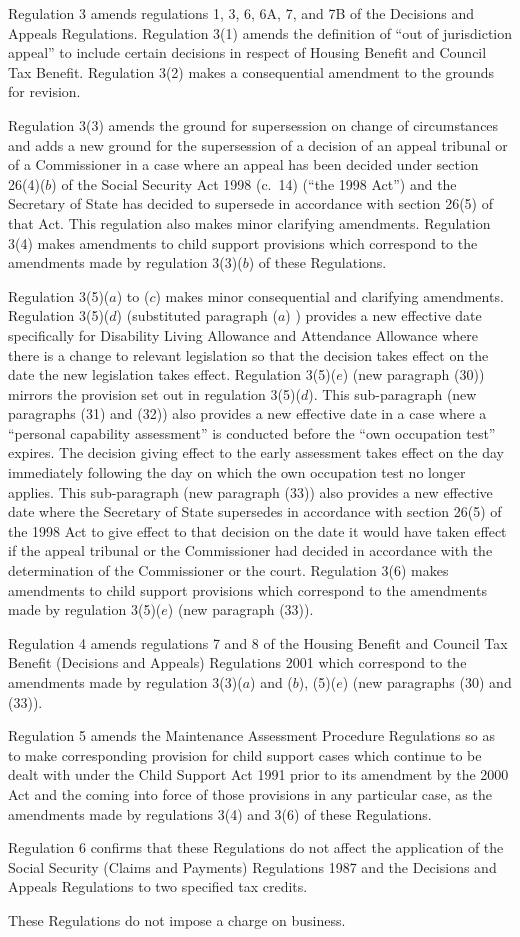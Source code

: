 \documentclass[12pt,a4paper]{article}
\begin{document}
Regulation 3 amends regulations 1, 3, 6, 6A, 7, and 7B of the Decisions and Appeals Regulations. Regulation 3(1) amends the definition of “out of jurisdiction appeal” to include certain decisions in respect of Housing Benefit and Council Tax Benefit. Regulation 3(2) makes a consequential amendment to the grounds for revision.

Regulation 3(3) amends the ground for supersession on change of circumstances and adds a new ground for the supersession of a decision of an appeal tribunal or of a Commissioner in a case where an appeal has been decided under section 26(4)($b$)  of the Social Security Act 1998 (c.\ 14) (“the 1998 Act”) and the Secretary of State has decided to supersede in accordance with section 26(5) of that Act. This regulation also makes minor clarifying amendments. Regulation 3(4) makes amendments to child support provisions which correspond to the amendments made by regulation 3(3)($b$)  of these Regulations.

Regulation 3(5)($a$)  to ($c$)  makes minor consequential and clarifying amendments. Regulation 3(5)($d$)  (substituted paragraph ($a$) ) provides a new effective date specifically for Disability Living Allowance and Attendance Allowance where there is a change to relevant legislation so that the decision takes effect on the date the new legislation takes effect. Regulation 3(5)($e$)  (new paragraph (30)) mirrors the provision set out in regulation 3(5)($d$). This sub-paragraph (new paragraphs (31) and (32)) also provides a new effective date in a case where a “personal capability assessment” is conducted before the “own occupation test” expires. The decision giving effect to the early assessment takes effect on the day immediately following the day on which the own occupation test no longer applies. This sub-paragraph (new paragraph (33)) also provides a new effective date where the Secretary of State supersedes in accordance with section 26(5) of the 1998 Act to give effect to that decision on the date it would have taken effect if the appeal tribunal or the Commissioner had decided in accordance with the determination of the Commissioner or the court. Regulation 3(6) makes amendments to child support provisions which correspond to the amendments made by regulation 3(5)($e$)  (new paragraph (33)).

Regulation 4 amends regulations 7 and 8 of the Housing Benefit and Council Tax Benefit (Decisions and Appeals) Regulations 2001 which correspond to the amendments made by regulation 3(3)($a$)  and ($b$), (5)($e$)  (new paragraphs (30) and (33)).

Regulation 5 amends the Maintenance Assessment Procedure Regulations so as to make corresponding provision for child support cases which continue to be dealt with under the Child Support Act 1991 prior to its amendment by the 2000 Act and the coming into force of those provisions in any particular case, as the amendments made by regulations 3(4) and 3(6) of these Regulations.

Regulation 6 confirms that these Regulations do not affect the application of the Social Security (Claims and Payments) Regulations 1987 and the Decisions and Appeals Regulations to two specified tax credits.

These Regulations do not impose a charge on business. 
\end{document}
